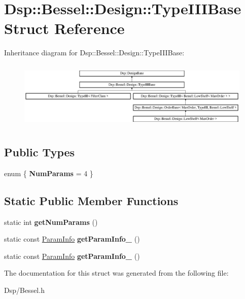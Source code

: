 \hypertarget{structDsp_1_1Bessel_1_1Design_1_1TypeIIIBase}{\section{Dsp\-:\-:Bessel\-:\-:Design\-:\-:Type\-I\-I\-I\-Base Struct Reference}
\label{structDsp_1_1Bessel_1_1Design_1_1TypeIIIBase}
}
Inheritance diagram for Dsp\-:\-:Bessel\-:\-:Design\-:\-:Type\-I\-I\-I\-Base\-:\begin{figure}[H]
\begin{center}
\leavevmode
\includegraphics[height=3.255814cm]{structDsp_1_1Bessel_1_1Design_1_1TypeIIIBase}
\end{center}
\end{figure}
\subsection*{Public Types}
\begin{DoxyCompactItemize}
\item 
enum \{ {\bfseries Num\-Params} =  4
 \}
\end{DoxyCompactItemize}
\subsection*{Static Public Member Functions}
\begin{DoxyCompactItemize}
\item 
\hypertarget{structDsp_1_1Bessel_1_1Design_1_1TypeIIIBase_a08219e104d11d02f744280fa7e58a6ff}{static int {\bfseries get\-Num\-Params} ()}\label{structDsp_1_1Bessel_1_1Design_1_1TypeIIIBase_a08219e104d11d02f744280fa7e58a6ff}

\item 
\hypertarget{structDsp_1_1Bessel_1_1Design_1_1TypeIIIBase_a6fde405861beccf3f4228f6020788eb0}{static const \hyperlink{classDsp_1_1ParamInfo}{Param\-Info} {\bfseries get\-Param\-Info\-\_} ()}\label{structDsp_1_1Bessel_1_1Design_1_1TypeIIIBase_a6fde405861beccf3f4228f6020788eb0}

\item 
\hypertarget{structDsp_1_1Bessel_1_1Design_1_1TypeIIIBase_ae97fc144009baf2ea4d0dc4ffaf14f73}{static const \hyperlink{classDsp_1_1ParamInfo}{Param\-Info} {\bfseries get\-Param\-Info\-\_} ()}\label{structDsp_1_1Bessel_1_1Design_1_1TypeIIIBase_ae97fc144009baf2ea4d0dc4ffaf14f73}

\end{DoxyCompactItemize}


The documentation for this struct was generated from the following file\-:\begin{DoxyCompactItemize}
\item 
Dsp/Bessel.\-h\end{DoxyCompactItemize}
